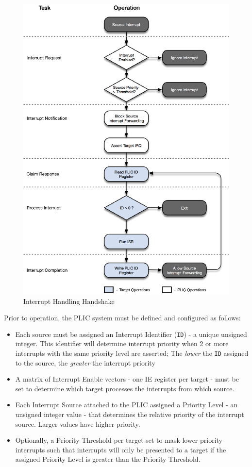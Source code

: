 \begin{figure}[!htb]
\includegraphics{assets/img/plic-handshake}
\caption{Interrupt Handling Handshake}
\label{fig:HANDSHAKE}
\end{figure}

Prior to operation, the PLIC system must be defined and configured as follows:

\begin{itemize}
	\item
		Each source must be assigned an Interrupt Identifier (\texttt{ID}) - a unique unsigned integer. This identifier will determine interrupt priority when 2 or more interrupts with the same priority level are asserted; The \emph{lower} the \texttt{ID} assigned to the source, the \emph{greater} the interrupt priority
	\item
		A matrix of Interrupt Enable vectors - one IE register per target - must be set to determine which target processes the interrupts from which source.
	\item
		Each Interrupt Source attached to the PLIC assigned a Priority Level - an unsigned integer value - that determines the relative priority of the interrupt source. Larger values have higher priority.
	\item
		Optionally, a Priority Threshold per target set to mask lower priority interrupts such that interrupts will only be presented to a target if the assigned Priority Level is greater than the Priority Threshold.
\end{itemize}

